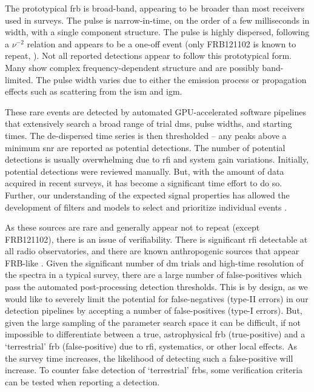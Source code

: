 \documentclass[a4paper,fleqn,usenatbib]{mnras}
\begin{document}
The prototypical \gls{frb} is broad-band, appearing to be broader than most
receivers used in surveys. The pulse is narrow-in-time, on the order of a few
milliseconds in width, with a single component structure. The pulse is highly
dispersed, following a $\nu^{-2}$ relation and appears to be a one-off event
(only FRB121102 is known to repeat, \citealt{2016Natur.531..202S}). Not all
reported detections appear to follow this prototypical form. Many show complex
frequency-dependent structure and are possibly band-limited. The pulse width
varies due to either the emission process or propagation effects such as
scattering from the \gls{ism} and \gls{igm}.

These rare events are detected by automated GPU-accelerated software pipelines
that extensively search a broad range of trial \glspl{dm}, pulse widths, and
starting times.  The de-dispersed time series is then thresholded -- any
peaks above a minimum \gls{snr} are reported as potential detections. The number
of potential detections is usually overwhelming due to \gls{rfi} and system gain
variations. Initially, potential detections were reviewed manually. But, with
the amount of data acquired in recent surveys, it has become a significant time
effort to do so. Further, our understanding of the expected signal properties
has allowed the development of filters and models to select and prioritize
individual events \citep[e.g.][]{2018MNRAS.474.3847F}.

As these sources are rare and generally appear not to repeat (except FRB121102),
there is an issue of verifiability. There is significant \gls{rfi} detectable at
all radio observatories, and there are known anthropogenic sources that appear
FRB-like \citep{2011ApJ...727...18B}.  Given the significant number of \gls{dm}
trials and high-time resolution of the spectra in a typical survey, there are a
large number of false-positives which pass the automated post-processing
detection thresholds.  This is by design, as we would like to severely limit the
potential for false-negatives (type-II errors) in our detection pipelines by
accepting a number of false-positives (type-I errors).  But, given the large
sampling of the parameter search space it can be difficult, if not impossible to
differentiate between a true, astrophysical \gls{frb} (true-positive) and a
`terrestrial' \gls{frb} (false-positive) due to \gls{rfi}, systematics, or other
local effects. As the survey time increases, the likelihood of detecting such a
false-positive will increase. To counter false detection of `terrestrial'
\glspl{frb}, some verification criteria can be tested when reporting a
detection.
\end{document}
